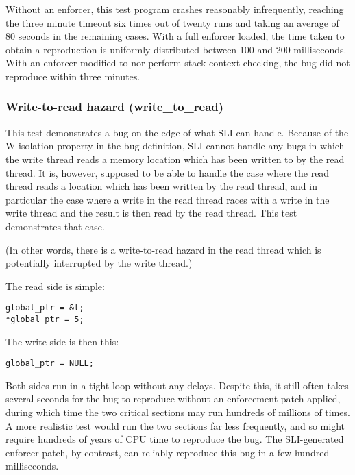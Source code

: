 Without an enforcer, this test program crashes reasonably
infrequently, reaching the three minute timeout six times out of
twenty runs and taking an average of 80 seconds in the remaining
cases.  With a full
enforcer loaded, the time taken to obtain a reproduction is uniformly
distributed between 100 and 200 milliseconds.  With an enforcer
modified to nor perform stack context checking, the bug did not
reproduce within three minutes.


\subsubsection{Write-to-read hazard (write\_to\_read)}

This test demonstrates a bug on the edge of what SLI can handle.
Because of the W isolation property in the bug definition, SLI cannot
handle any bugs in which the write thread reads a memory location
which has been written to by the read thread.  It is, however,
supposed to be able to handle the case where the read thread reads a
location which has been written by the read thread, and in particular
the case where a write in the read thread races with a write in the
write thread and the result is then read by the read thread.  This
test demonstrates that case.

(In other words, there is a write-to-read hazard in the read thread
which is potentially interrupted by the write thread.)

The read side is simple:

\begin{verbatim}
global_ptr = &t;
*global_ptr = 5;
\end{verbatim}

The write side is then this:

\begin{verbatim}
global_ptr = NULL;
\end{verbatim}

Both sides run in a tight loop without any delays.  Despite this, it
still often takes several seconds for the bug to reproduce without an
enforcement patch applied, during which time the two critical sections
may run hundreds of millions of times.  A more realistic test would
run the two sections far less frequently, and so might require
hundreds of years of CPU time to reproduce the bug.  The SLI-generated
enforcer patch, by contrast, can reliably reproduce this bug in a few
hundred milliseconds.

